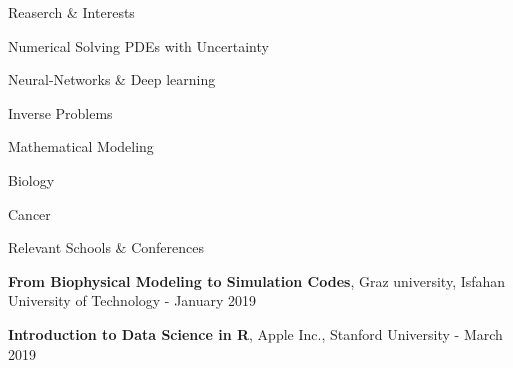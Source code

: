 \documentclass{resume} %
\begin{document}
\begin{rSection}{Reaserch \& Interests}	
	\begin{rSubsection}{}{}{}{}
		\item Numerical Solving PDEs with Uncertainty
		\item Neural-Networks \& Deep learning
		\item Inverse Problems
		\item Mathematical Modeling
		\item Biology
		\item Cancer
	\end{rSubsection}	
\end{rSection}
\begin{rSection}{Relevant Schools \& Conferences}	
	\begin{rSubsection}{}{}{}{}
		\item \textbf{From Biophysical Modeling to Simulation Codes}, Graz university, Isfahan University of Technology - January 2019
		
		\item \textbf{Introduction to Data Science in R}, Apple Inc., Stanford University - March 2019
	\end{rSubsection}
\end{rSection}
\end{document}
